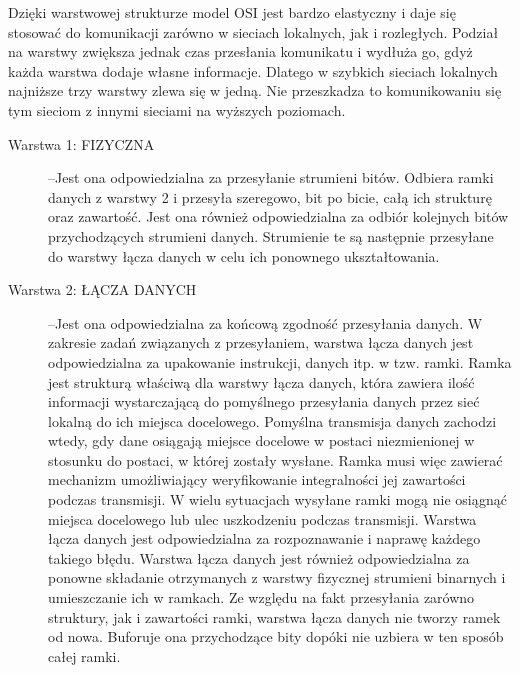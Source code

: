 \documentclass[a4paper,11pt]{article}
\begin{document}
Dzięki warstwowej strukturze model OSI jest bardzo elastyczny i daje się stosować do komunikacji zarówno w sieciach lokalnych, jak i rozległych. Podział na warstwy zwiększa jednak czas przesłania komunikatu i wydłuża go, gdyż każda warstwa dodaje własne informacje. Dlatego w szybkich sieciach lokalnych najniższe trzy warstwy zlewa się w jedną. Nie przeszkadza to komunikowaniu się tym sieciom z innymi sieciami na wyższych poziomach. 
\begin {description}
\item[Warstwa 1: FIZYCZNA]--Jest ona odpowiedzialna za przesyłanie strumieni bitów. Odbiera ramki danych z warstwy 2 i przesyła szeregowo, bit po bicie, całą ich strukturę oraz zawartość. Jest ona również odpowiedzialna za odbiór kolejnych bitów przychodzących strumieni danych. Strumienie te są następnie przesyłane do warstwy łącza danych w celu ich ponownego ukształtowania. 

\item[Warstwa 2: ŁĄCZA DANYCH]--Jest ona odpowiedzialna za końcową zgodność przesyłania danych. W zakresie zadań związanych z przesyłaniem, warstwa łącza danych jest odpowiedzialna za upakowanie instrukcji, danych itp. w tzw. ramki. Ramka jest strukturą właściwą dla warstwy łącza danych, która zawiera ilość informacji wystarczającą do pomyślnego przesyłania danych przez sieć lokalną do ich miejsca docelowego. Pomyślna transmisja danych zachodzi wtedy, gdy dane osiągają miejsce docelowe w postaci niezmienionej w stosunku do postaci, w której zostały wysłane. Ramka musi więc zawierać mechanizm umożliwiający weryfikowanie integralności jej zawartości podczas transmisji. W wielu sytuacjach wysyłane ramki mogą nie osiągnąć miejsca docelowego lub ulec uszkodzeniu podczas transmisji. Warstwa łącza danych jest odpowiedzialna za rozpoznawanie i naprawę każdego takiego błędu. Warstwa łącza danych jest również odpowiedzialna za ponowne składanie otrzymanych z warstwy fizycznej strumieni binarnych i umieszczanie ich w ramkach. Ze względu na fakt przesyłania zarówno struktury, jak i zawartości ramki, warstwa łącza danych nie tworzy ramek od nowa. Buforuje ona przychodzące bity dopóki nie uzbiera w ten sposób całej ramki. 


\end{description}
\end{document}
